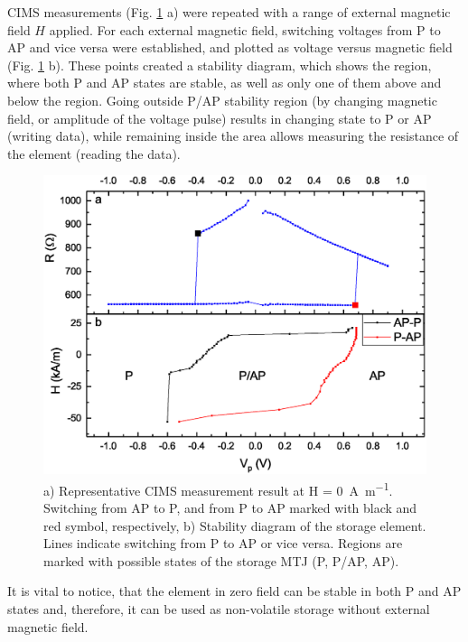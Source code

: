     CIMS measurements (Fig. \ref{ExperimentMeasurementEye} a) were repeated with a range of external magnetic field $H$ applied. For each external magnetic field, switching voltages from P to AP and vice versa were established, and plotted as voltage versus magnetic field (Fig. \ref{ExperimentMeasurementEye} b). These points created a stability diagram, which shows the region, where both P and AP states are stable, as well as only one of them above and below the region. Going outside P/AP stability region (by changing magnetic field, or amplitude of the voltage pulse) results in changing state to P or AP (writing data), while remaining inside the area allows measuring the resistance of the element (reading the data).
    
    \begin{figure}[H]
        \centering
        \includegraphics[width=0.7\paperwidth]{img/05/ResultsEye.eps}
        \caption{a) Representative CIMS measurement result at \SI[parse-numbers = false, number-math-rm = \ensuremath, per-mode=symbol]{H = 0}{\ampere\per\metre}. Switching from AP to P, and from P to AP marked with black and red symbol, respectively, b) Stability diagram of the storage element. Lines indicate switching from P to AP or vice versa. Regions are marked with possible states of the storage MTJ (P, P/AP, AP).}
        \label{ExperimentMeasurementEye}
    \end{figure}

    It is vital to notice, that the element in zero field can be stable in both P and AP states and, therefore, it can be used as non-volatile storage without external magnetic field.    
    
